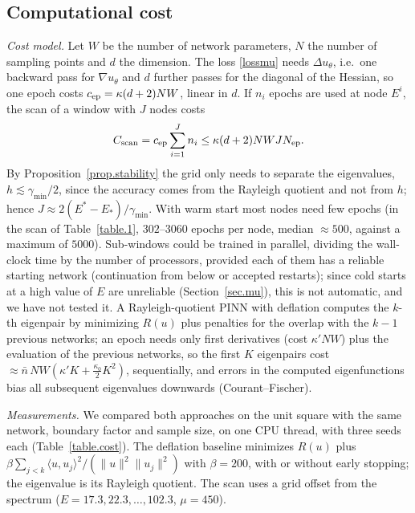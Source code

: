 \documentclass[10pt]{amsart}
\newenvironment{revblock}{\color{blue}}{}
\theoremstyle{definition}
\theoremstyle{remark}
\theoremstyle{plain}
\begin{document}
\subsection{Computational cost}\label{sec.cost}
\begin{revblock}
\emph{Cost model.} Let $W$ be the number of network parameters, $N$ the number of sampling points and
$d$ the dimension. The loss \eqref{lossmu} needs $\Delta u_\theta$, i.e.\ one backward pass for
$\nabla u_\theta$ and $d$ further passes for the diagonal of the Hessian, so one epoch costs
$c_{\rm ep}=\kappa(d+2)NW$, linear in $d$. If $n_i$ epochs are used at node $E^i$, the scan of a
window with $J$ nodes costs
\begin{equation}\label{cost.scan}
C_{\rm scan}=c_{\rm ep}\sum_{i=1}^Jn_i\le\kappa(d+2)NWJN_{\rm ep}.
\end{equation}
By Proposition~\ref{prop.stability} the grid only needs to separate the eigenvalues, $h\lesssim
\gamma_{\min}/2$, since the accuracy comes from the Rayleigh quotient and not from $h$; hence
$J\approx2(E^*-E_*)/\gamma_{\min}$. With warm start most nodes need few epochs (in the scan of
Table~\ref{table.1}, $302$--$3060$ epochs per node, median $\approx500$, against a maximum of $5000$). Sub-windows
could be trained in parallel, dividing the wall-clock time by the number of processors, provided each
of them has a reliable starting network (continuation from below or accepted restarts); since cold
starts at a high value of $E$ are unreliable (Section~\ref{sec.mu}), this is not automatic, and we have
not tested it. A Rayleigh-quotient
PINN with deflation \cite{Rowan-Evans-Maute-Dootsan,Holliday-Lindner-Ditto,E-Yu} computes the
$k$-th eigenpair by minimizing $R(u)$ plus penalties for the overlap with the $k-1$ previous networks;
an epoch needs only first derivatives (cost $\kappa'NW$) plus the evaluation of the previous networks,
so the first $K$ eigenpairs cost $\approx\bar n\,NW(\kappa'K+\frac{\kappa_0}2K^2)$, sequentially, and errors
in the computed eigenfunctions bias all subsequent eigenvalues downwards (Courant--Fischer).

\emph{Measurements.} We compared both approaches on the unit square with the same network, boundary
factor and sample size, on one CPU thread, with three seeds each (Table~\ref{table.cost}). The
deflation baseline minimizes $R(u)$ plus $\beta\sum_{j<k}\langle u,u_j\rangle^2/(\|u\|^2\|u_j\|^2)$
with $\beta=200$, with or without early stopping; the eigenvalue is its Rayleigh quotient. The scan
uses a grid offset from the spectrum ($E=17.3,22.3,\dots,102.3$, $\mu=450$).


\end{revblock}
\end{document}
